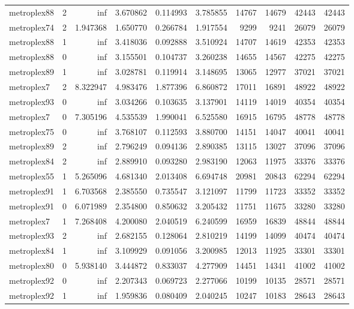 \begin{longtable}{|l|r|r|r|r|r|r|r|r|r|}
metroplex88 & 2 & inf & 3.670862 & 0.114993 & 3.785855 & 14767 & 14679 & 42443 & 42443 \\
metroplex74 & 2 & 1.947368 & 1.650770 & 0.266784 & 1.917554 & 9299 & 9241 & 26079 & 26079 \\
metroplex88 & 1 & inf & 3.418036 & 0.092888 & 3.510924 & 14707 & 14619 & 42353 & 42353 \\
metroplex88 & 0 & inf & 3.155501 & 0.104737 & 3.260238 & 14655 & 14567 & 42275 & 42275 \\
metroplex89 & 1 & inf & 3.028781 & 0.119914 & 3.148695 & 13065 & 12977 & 37021 & 37021 \\
metroplex7 & 2 & 8.322947 & 4.983476 & 1.877396 & 6.860872 & 17011 & 16891 & 48922 & 48922 \\
metroplex93 & 0 & inf & 3.034266 & 0.103635 & 3.137901 & 14119 & 14019 & 40354 & 40354 \\
metroplex7 & 0 & 7.305196 & 4.535539 & 1.990041 & 6.525580 & 16915 & 16795 & 48778 & 48778 \\
metroplex75 & 0 & inf & 3.768107 & 0.112593 & 3.880700 & 14151 & 14047 & 40041 & 40041 \\
metroplex89 & 2 & inf & 2.796249 & 0.094136 & 2.890385 & 13115 & 13027 & 37096 & 37096 \\
metroplex84 & 2 & inf & 2.889910 & 0.093280 & 2.983190 & 12063 & 11975 & 33376 & 33376 \\
metroplex55 & 1 & 5.265096 & 4.681340 & 2.013408 & 6.694748 & 20981 & 20843 & 62294 & 62294 \\
metroplex91 & 1 & 6.703568 & 2.385550 & 0.735547 & 3.121097 & 11799 & 11723 & 33352 & 33352 \\
metroplex91 & 0 & 6.071989 & 2.354800 & 0.850632 & 3.205432 & 11751 & 11675 & 33280 & 33280 \\
metroplex7 & 1 & 7.268408 & 4.200080 & 2.040519 & 6.240599 & 16959 & 16839 & 48844 & 48844 \\
metroplex93 & 2 & inf & 2.682155 & 0.128064 & 2.810219 & 14199 & 14099 & 40474 & 40474 \\
metroplex84 & 1 & inf & 3.109929 & 0.091056 & 3.200985 & 12013 & 11925 & 33301 & 33301 \\
metroplex80 & 0 & 5.938140 & 3.444872 & 0.833037 & 4.277909 & 14451 & 14341 & 41002 & 41002 \\
metroplex92 & 0 & inf & 2.207343 & 0.069723 & 2.277066 & 10199 & 10135 & 28571 & 28571 \\
metroplex92 & 1 & inf & 1.959836 & 0.080409 & 2.040245 & 10247 & 10183 & 28643 & 28643 \\

\end{longtable}

